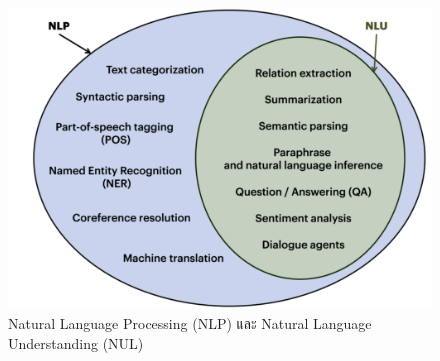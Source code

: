 \begin{figure}[hbt!]
  \begin{center}
    \includegraphics[width=\textwidth,keepaspectratio]{pic/NLPandNUL.png}
  \end{center}
  \caption{Natural Language Processing (NLP) และ Natural Language Understanding (NUL)}
  \label{fig:NLPandNUL}
\end{figure}

